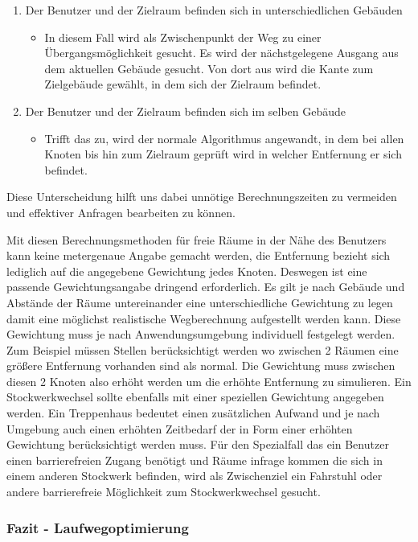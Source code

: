 \begin{enumerate}
	\item Der Benutzer und der Zielraum befinden sich in unterschiedlichen Gebäuden
	\begin{itemize}
		\item In diesem Fall wird als Zwischenpunkt der Weg zu einer Übergangsmöglichkeit gesucht.
		Es wird \zB der nächstgelegene Ausgang aus dem aktuellen Gebäude gesucht.
		Von dort aus wird die Kante zum Zielgebäude gewählt, in dem sich der Zielraum befindet.
	\end{itemize}
	\item Der Benutzer und der Zielraum befinden sich im selben Gebäude
	\begin{itemize}
		\item Trifft das zu, wird der normale Algorithmus angewandt, in dem bei allen Knoten bis
		hin zum Zielraum geprüft wird in welcher Entfernung er sich befindet.
	\end{itemize}
\end{enumerate}

Diese Unterscheidung hilft uns dabei unnötige Berechnungszeiten zu vermeiden
und effektiver Anfragen bearbeiten zu können.

Mit diesen Berechnungsmethoden für freie Räume in der Nähe des Benutzers kann
keine metergenaue Angabe gemacht werden, die Entfernung bezieht sich lediglich
auf die angegebene Gewichtung jedes Knoten. Deswegen ist eine passende
Gewichtungsangabe dringend erforderlich. Es gilt je nach Gebäude und Abstände
der Räume untereinander eine unterschiedliche Gewichtung zu legen damit eine
möglichst realistische Wegberechnung aufgestellt werden kann. Diese Gewichtung
muss je nach Anwendungsumgebung individuell festgelegt werden. Zum Beispiel
müssen Stellen berücksichtigt werden wo zwischen 2 Räumen eine größere
Entfernung vorhanden sind als normal. Die Gewichtung muss zwischen diesen
2 Knoten also erhöht werden um die erhöhte Entfernung zu simulieren.
Ein Stockwerkwechsel sollte ebenfalls mit einer speziellen Gewichtung
angegeben werden. Ein Treppenhaus bedeutet einen zusätzlichen Aufwand und je
nach Umgebung auch einen erhöhten Zeitbedarf der in Form einer erhöhten
Gewichtung berücksichtigt werden muss. Für den Spezialfall das ein Benutzer
einen barrierefreien Zugang benötigt und Räume infrage kommen die sich in
einem anderen Stockwerk befinden, wird als Zwischenziel ein Fahrstuhl oder
andere barrierefreie Möglichkeit zum Stockwerkwechsel gesucht.

\subsubsection{Fazit - Laufwegoptimierung}
\label{sec:Fazit - Laufwegoptimierung}


